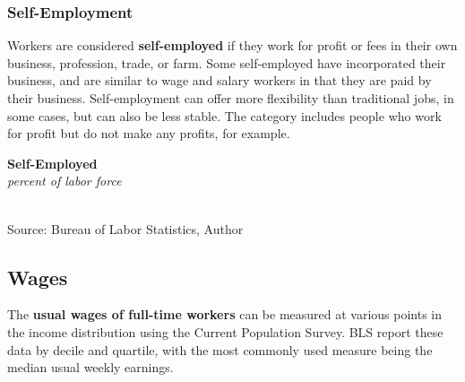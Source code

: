 \documentclass{report}
\makeatletter
\newcommand{\tbllink}[1]{\href{https://raw.githubusercontent.com/bdecon/US-chartbook/master/chartbook/data/#1}{\faTable}}
\newcommand*\short[1]{\expandafter\@gobbletwo\number\numexpr#1\relax}
\newcommand{\absnode}[3]{\node[below right, align=left] at (axis cs: #1,#2) {#3};}
\newcommand{\shdateaxisticks}{
		date coordinates in=x, axis line style={draw=none},
		xmax={2023-02-15},
		max space between ticks=40,	    
		xtick={{1990-01-01}, {1995-01-01}, {2000-01-01}, 
			{2005-01-01}, {2010-01-01}, {2015-01-01}, {2020-01-01}},
		minor xtick={},
		enlarge y limits={0.06}, enlarge x limits={0.01},
		}
\newcommand{\bbar}[2]{extra #1 ticks = {{#2}}, extra #1 tick labels = ,
		extra #1 tick style = {grid=major, grid style={thick, black!25}},}
\newcommand{\stdline}[4]{\addplot[very thick, no markers, color=#1] 
		table [x=#2, y=#3, col sep=comma] {#4};	}
\newcommand{\rbars}{
		\fill[color=black!10] (axis cs:{1990-07-01},\pgfkeysvalueof{/pgfplots/ymin}) rectangle 
			(axis cs:{1991-03-01}, \pgfkeysvalueof{/pgfplots/ymax});
		\fill[color=black!10] (axis cs:{2007-12-01},\pgfkeysvalueof{/pgfplots/ymin}) rectangle 
			(axis cs:{2009-07-01}, \pgfkeysvalueof{/pgfplots/ymax});
		\fill[color=black!10] (axis cs:{2001-03-01},\pgfkeysvalueof{/pgfplots/ymin}) rectangle 
			(axis cs:{2001-11-01}, \pgfkeysvalueof{/pgfplots/ymax});
		\fill[color=black!10] (axis cs:{2020-02-01},\pgfkeysvalueof{/pgfplots/ymin}) rectangle 
			(axis cs:{2020-05-01}, \pgfkeysvalueof{/pgfplots/ymax});}
\makeatother
\begin{document}
{\begin{minipage}{0.76\textwidth}
\subsubsection*{Self-Employment}
\small Workers are considered \textbf{self-employed} if they work for profit or fees in their own business, profession, trade, or farm. Some self-employed have incorporated their business, and are similar to wage and salary workers in that they are paid by their business. Self-employment can offer more flexibility than traditional jobs, in some cases, but can also be less stable. The category includes people who work for profit but do not make any profits, for example. 


\vspace{0.5mm}

\begin{minipage}{0.56\textwidth}
\normalsize \textbf{Self-Employed}\\
\footnotesize{\textit{percent of labor force}}\\
\hspace*{-2mm} \\
\footnotesize{Source: Bureau of Labor Statistics, Author} \hfill \tbllink{selfemp.csv} 
\end{minipage} \hfill
\begin{minipage}{0.38\textwidth}
\small 
\end{minipage}
\end{minipage}
\newpage
\begin{minipage}{0.76\textwidth}
\subsection*{Wages}
\hypertarget{labw}{}
\small The \textbf{usual wages of full-time workers} can be measured at various points in the income distribution using the Current Population Survey. BLS report these data by decile and quartile, with the most commonly used measure being the median usual weekly earnings.


\end{minipage}}
\end{document}
